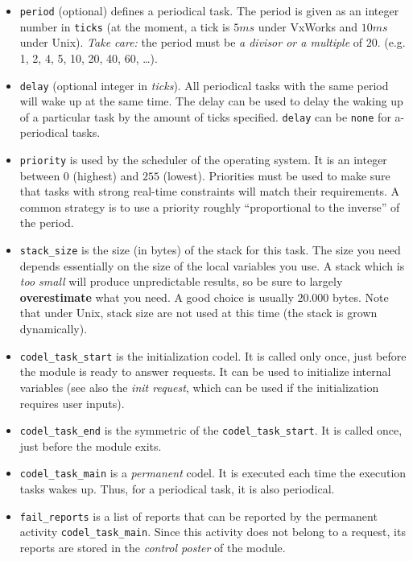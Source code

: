 \begin{itemize}
\item {\tt period} (optional) defines a periodical task. The period is
given as an integer number in {\tt ticks} (at the moment, a tick is $5ms$
under VxWorks and $10ms$ under Unix). {\em Take care:} the period must be
{\em a divisor or a multiple} of $20$. (e.g. 1, 2, 4, 5, 10, 20, 40, 60,
\ldots).

\item {\tt delay} (optional integer in {\em ticks}). All periodical
tasks with the same period  will wake up at the  same time. The delay can
be used to delay the waking up of a particular task  by the amount of ticks
specified. {\tt delay} can be {\tt none} for  a-periodical tasks.

\item {\tt priority} is used by the scheduler of the operating system. It
is an integer  between $0$ (highest) and  $255$ (lowest). Priorities must
be used to make  sure that tasks  with strong real-time constraints  will
match their requirements.  A common strategy is to use a priority roughly
``proportional to the inverse'' of the period.

\item {\tt stack\_size} is the size (in bytes) of the stack for this
task. The size you  need  depends essentially on   the size of the  local
variables you  use.  A   stack which  is {\em   too small} will   produce
unpredictable results, so be sure  to largely {\bf overestimate} what you
need.   A  good choice is  usually   $20.000$  bytes. Note that under
Unix, stack size are not used at this time (the stack is grown dynamically).

\item {\tt codel\_task\_start} is the initialization codel. It is called only
once, just before the module is ready to answer requests.  It can be used
to initialize internal variables (see also  the {\em init request}, which
can be used if the initialization requires user inputs).

\item {\tt codel\_task\_end} is the symmetric of the {\tt codel\_task\_start}. It
is called once, just before the module exits.

\item {\tt codel\_task\_main} is a {\em permanent} codel. It is executed each time
the execution tasks wakes  up. Thus, for  a  periodical task, it is  also
periodical.

\item {\tt fail\_reports} is a list of reports that can be reported by the
permanent activity {\tt codel\_task\_main}. Since  this activity does not belong to
a request, its  reports are  stored in  the  {\em control poster} of  the
module.
\end{itemize}
